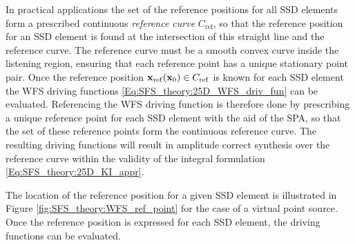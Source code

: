 In practical applications the set of the reference positions for all SSD elements form a prescribed continuous \emph{reference curve} $C_{\mathrm{ref}}$, so that the reference position for an SSD element is found at the intersection of this straight line and the reference curve.
The reference curve must be a smooth convex curve inside the listening region, ensuring that each reference point has a unique stationary point pair.
Once the reference position $\mathbf{x}_{\mathrm{ref}}(\mathbf{x}_0) \in C_{\mathrm{ref}}$ is known for each SSD element the WFS driving functions \eqref{Eq:SFS_theory:25D_WFS_driv_fun} can be evaluated.
Referencing the WFS driving function is therefore done by prescribing a unique reference point for each SSD element with the aid of the SPA, so that the set of these reference points form the continuous reference curve.
The resulting driving functions will result in amplitude correct synthesis over the reference curve within the validity of the integral formulation \eqref{Eq:SFS_theory:25D_KI_appr}.

The location of the reference position for a given SSD element is illustrated in Figure \ref{fig:SFS_theory:WFS_ref_point} for the case of a virtual point source. 
Once the reference position is expressed for each SSD element, the driving functions can be evaluated.

